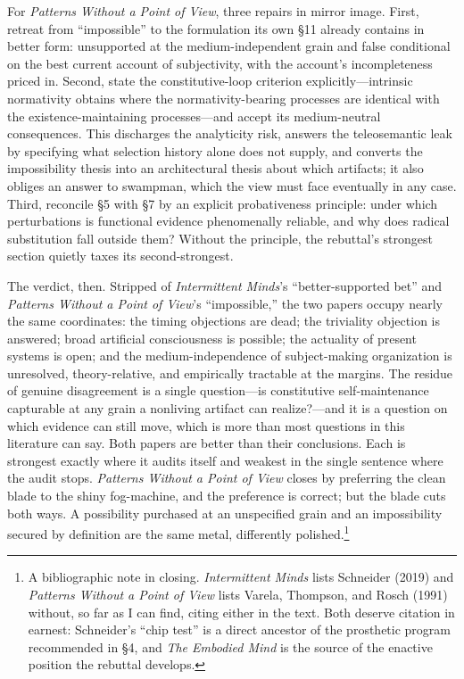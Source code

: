 \documentclass[11pt]{article}
\newcommand{\IM}{\emph{Intermittent Minds}}
\newcommand{\PP}{\emph{Patterns Without a Point of View}}
\begin{document}
For \PP{}, three repairs in mirror image. First, retreat from ``impossible'' to the formulation its own \S 11 already contains in better form: unsupported at the medium-independent grain and false conditional on the best current account of subjectivity, with the account's incompleteness priced in. Second, state the constitutive-loop criterion explicitly---intrinsic normativity obtains where the normativity-bearing processes are identical with the existence-maintaining processes---and accept its medium-neutral consequences. This discharges the analyticity risk, answers the teleosemantic leak by specifying what selection history alone does not supply, and converts the impossibility thesis into an architectural thesis about which artifacts; it also obliges an answer to swampman, which the view must face eventually in any case. Third, reconcile \S 5 with \S 7 by an explicit probativeness principle: under which perturbations is functional evidence phenomenally reliable, and why does radical substitution fall outside them? Without the principle, the rebuttal's strongest section quietly taxes its second-strongest.

The verdict, then. Stripped of \IM{}'s ``better-supported bet'' and \PP{}'s ``impossible,'' the two papers occupy nearly the same coordinates: the timing objections are dead; the triviality objection is answered; broad artificial consciousness is possible; the actuality of present systems is open; and the medium-independence of subject-making organization is unresolved, theory-relative, and empirically tractable at the margins. The residue of genuine disagreement is a single question---is constitutive self-maintenance capturable at any grain a nonliving artifact can realize?---and it is a question on which evidence can still move, which is more than most questions in this literature can say. Both papers are better than their conclusions. Each is strongest exactly where it audits itself and weakest in the single sentence where the audit stops. \PP{} closes by preferring the clean blade to the shiny fog-machine, and the preference is correct; but the blade cuts both ways. A possibility purchased at an unspecified grain and an impossibility secured by definition are the same metal, differently polished.\footnote{A bibliographic note in closing. \IM{} lists Schneider (2019) and \PP{} lists Varela, Thompson, and Rosch (1991) without, so far as I can find, citing either in the text. Both deserve citation in earnest: Schneider's ``chip test'' is a direct ancestor of the prosthetic program recommended in \S 4, and \emph{The Embodied Mind} is the source of the enactive position the rebuttal develops.}
\end{document}
